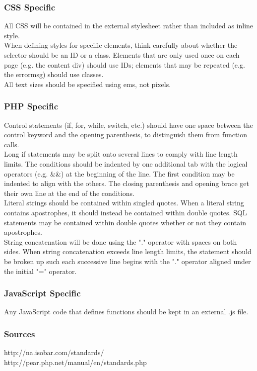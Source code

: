 		\subsubsection{CSS Specific}
			All CSS will be contained in the external stylesheet rather than included as inline style.\\When defining styles for specific elements, think carefully about whether the selector should be an ID or a class. Elements that are only used once on each page (e.g. the content div) should use IDs; elements that may be repeated (e.g. the errormsg) should use classes.\\All text sizes should be specified using ems, not pixels.
			
		\subsubsection{PHP Specific}
			Control statements (if, for, while, switch, etc.) should have one space between the control keyword and the opening parenthesis, to distinguish them from function calls.\\Long if statements may be split onto several lines to comply with line length limits. The conditions should be indented by one additional tab with the logical operators (e.g. \&\&) at the beginning of the line. The first condition may be indented to align with the others. The closing parenthesis and opening brace get their own line at the end of the conditions.\\Literal strings should be contained within singled quotes. When a literal string contains apostrophes, it should instead be contained within double quotes. SQL statements may be contained within double quotes whether or not they contain apostrophes.\\String concatenation will be done using the "." operator with spaces on both sides. When string concatenation exceeds line length limits, the statement should be broken up such each successive line begins with the "." operator aligned under the initial "=" operator.
			
		\subsubsection{JavaScript Specific}
			Any JavaScript code that defines functions should be kept in an external .js file.
			
		\subsubsection{Sources}
			http://na.isobar.com/standards/\\
			http://pear.php.net/manual/en/standards.php
			
